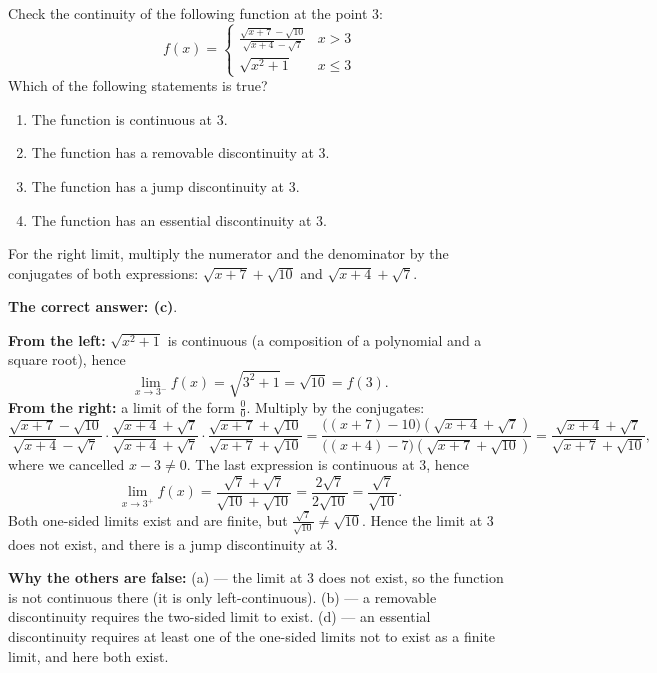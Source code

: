
\begin{question}
Check the continuity of the following function at the point 3:
\[
f(x)=\begin{cases}
\frac{\sqrt{x+7}-\sqrt{10}}{\sqrt{x+4}-\sqrt{7}} & x>3\\
\sqrt{x^2+1} & x\le 3
\end{cases}
\]
Which of the following statements is true?
\begin{enumerate}
  \item The function is continuous at 3.
  \item The function has a removable discontinuity at 3.
  \item The function has a jump discontinuity at 3.
  \item The function has an essential discontinuity at 3.
\end{enumerate}
\end{question}

\begin{hint}
For the right limit, multiply the numerator and the denominator by the conjugates of both expressions: $\sqrt{x+7}+\sqrt{10}$ and $\sqrt{x+4}+\sqrt7$.
\end{hint}

\begin{solution}
\textbf{The correct answer: (c)}.

\textbf{From the left:} $\sqrt{x^2+1}$ is continuous (a composition of a polynomial and a square root), hence
\[
\lim_{x\to3^-}f(x)=\sqrt{3^2+1}=\sqrt{10}=f(3).
\]
\textbf{From the right:} a limit of the form $\frac00$. Multiply by the conjugates:
\[
\frac{\sqrt{x+7}-\sqrt{10}}{\sqrt{x+4}-\sqrt7}\cdot\frac{\sqrt{x+4}+\sqrt7}{\sqrt{x+4}+\sqrt7}\cdot\frac{\sqrt{x+7}+\sqrt{10}}{\sqrt{x+7}+\sqrt{10}}
=\frac{\bigl((x+7)-10\bigr)\left(\sqrt{x+4}+\sqrt7\right)}{\bigl((x+4)-7\bigr)\left(\sqrt{x+7}+\sqrt{10}\right)}
=\frac{\sqrt{x+4}+\sqrt7}{\sqrt{x+7}+\sqrt{10}},
\]
where we cancelled $x-3\neq0$. The last expression is continuous at 3, hence
\[
\lim_{x\to3^+}f(x)=\frac{\sqrt7+\sqrt7}{\sqrt{10}+\sqrt{10}}=\frac{2\sqrt7}{2\sqrt{10}}=\frac{\sqrt7}{\sqrt{10}} .
\]
Both one-sided limits exist and are finite, but $\frac{\sqrt7}{\sqrt{10}}\neq\sqrt{10}$. Hence the limit at 3 does not exist, and there is a jump discontinuity at 3.

\textbf{Why the others are false:} (a) --- the limit at 3 does not exist, so the function is not continuous there (it is only left-continuous). (b) --- a removable discontinuity requires the two-sided limit to exist. (d) --- an essential discontinuity requires at least one of the one-sided limits not to exist as a finite limit, and here both exist.
\end{solution}
